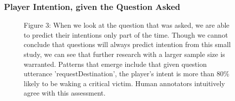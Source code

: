 \newpage
\subsubsection{ Player Intention, given the Question Asked}



\begin{figure}[h!]
    \centering
    \caption{Figure 3: When we look at the question that was asked, we are able to predict their intentions only part of the time. Though we cannot conclude that questions will always predict intention from this small study, we can see that further research with a larger sample size is warranted. Patterns that emerge include that given question utterance 'requestDestination', the player's intent is more than 80\% likely to be waking a critical victim. Human annotators intuitively agree with this assessment.}
\end{figure}








\newpage

